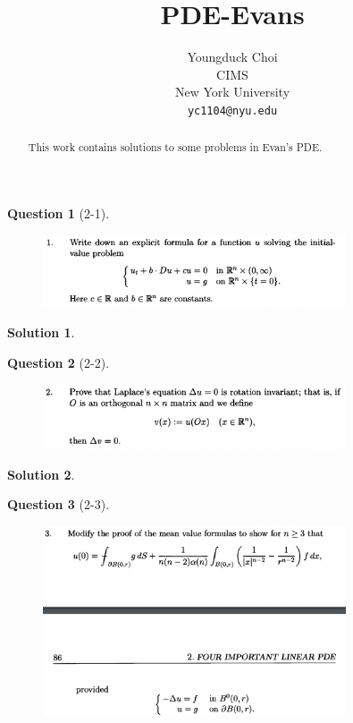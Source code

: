 \documentclass{article} %
\title{PDE-Evans}
\author{
Youngduck Choi \\
CIMS \\
New York University\\
\texttt{yc1104@nyu.edu} \\
}
\theoremstyle{quest}
\newtheorem*{question}{Question}
\newtheorem*{solution}{Solution}
\begin{document}
\maketitle

\begin{abstract}
This work contains solutions to some 
problems in Evan's PDE.
\end{abstract}

\bigskip

\begin{question}[2-1]
\hfill
\begin{figure}[h!]
  \centering
    \includegraphics[width=0.8\textwidth]{evans-2-1.png}
\end{figure}
\end{question}

\begin{solution}
\end{solution}

\newpage

\begin{question}[2-2]
\hfill
\begin{figure}[h!]
  \centering
    \includegraphics[width=0.8\textwidth]{evans-2-2.png}
\end{figure}
\end{question}


\begin{solution}
\end{solution}

\newpage

\begin{question}[2-3]
\hfill
\begin{figure}[h!]
  \centering
    \includegraphics[width=0.8\textwidth]{evans-2-3.png}
\end{figure}
\end{question}
\end{document}

